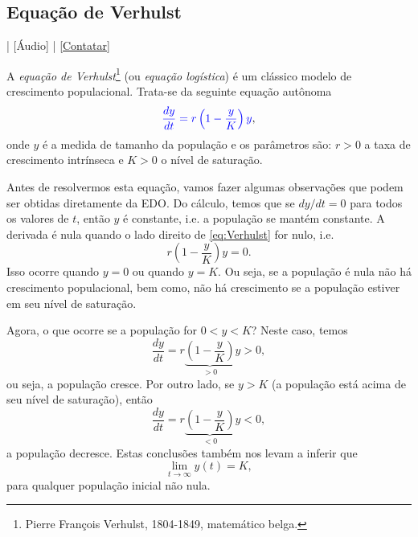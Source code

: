 \subsection{Equação de Verhulst}

\begin{flushright}
  [Vídeo] | [Áudio] | \href{https://phkonzen.github.io/notas/contato.html}{[Contatar]}
\end{flushright}

A \emph{equação de Verhulst}\footnote{Pierre François Verhulst, 1804-1849, matemático belga.} (ou \emph{equação logística}) é um clássico modelo de crescimento populacional. Trata-se da seguinte equação autônoma
\begin{equation}\label{eq:Verhulst}
  {\color{blue}\frac{dy}{dt} = r\left(1 - \frac{y}{K}\right)y},
\end{equation}
onde $y$ é a medida de tamanho da população e os parâmetros são: $r>0$ a taxa de crescimento intrínseca e $K>0$ o nível de saturação.

Antes de resolvermos esta equação, vamos fazer algumas observações que podem ser obtidas diretamente da EDO. Do cálculo, temos que se $dy/dt = 0$ para todos os valores de $t$, então $y$ é constante, i.e. a população se mantém constante. A derivada é nula quando o lado direito de \eqref{eq:Verhulst} for nulo, i.e.
\begin{equation}
  r\left(1 - \frac{y}{K}\right)y = 0.
\end{equation}
Isso ocorre quando $y = 0$ ou quando $y=K$. Ou seja, se a população é nula não há crescimento populacional, bem como, não há crescimento se a população estiver em seu nível de saturação.

Agora, o que ocorre se a população for $0 < y < K$? Neste caso, temos
\begin{equation}
  \frac{dy}{dt} = r\underbrace{\left(1 - \frac{y}{K}\right)}_{>0}y > 0,
\end{equation}
ou seja, a população cresce. Por outro lado, se $y > K$ (a população está acima de seu nível de saturação), então
\begin{equation}
  \frac{dy}{dt} = r\underbrace{\left(1 - \frac{y}{K}\right)}_{<0}y < 0,
\end{equation}
a população decresce. Estas conclusões também nos levam a inferir que
\begin{equation}
  \lim_{t\to\infty} y(t) = K,
\end{equation}
para qualquer população inicial não nula.

